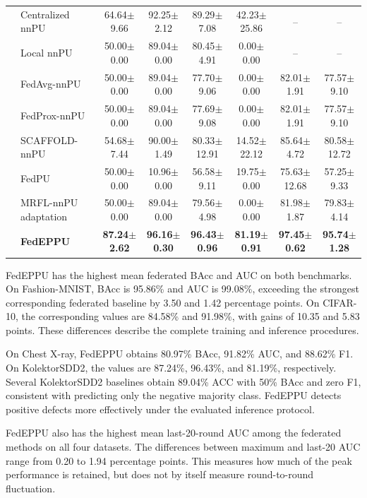 \documentclass[lettersize,journal]{IEEEtran}
\begin{document}
\begin{table}[!t]
\begin{tabular}{llcccccc}
& Centralized nnPU & 64.64$\pm$9.66 & 92.25$\pm$2.12 & 89.29$\pm$7.08 & 42.23$\pm$25.86 & -- & -- \\
& Local nnPU & 50.00$\pm$0.00 & 89.04$\pm$0.00 & 80.45$\pm$4.91 & 0.00$\pm$0.00 & -- & -- \\
& FedAvg-nnPU & 50.00$\pm$0.00 & 89.04$\pm$0.00 & 77.70$\pm$9.06 & 0.00$\pm$0.00 & 82.01$\pm$1.91 & 77.57$\pm$9.10 \\
& FedProx-nnPU & 50.00$\pm$0.00 & 89.04$\pm$0.00 & 77.69$\pm$9.08 & 0.00$\pm$0.00 & 82.01$\pm$1.91 & 77.57$\pm$9.10 \\
& SCAFFOLD-nnPU & 54.68$\pm$7.44 & 90.00$\pm$1.49 & 80.33$\pm$12.91 & 14.52$\pm$22.12 & 85.64$\pm$4.72 & 80.58$\pm$12.72 \\
& FedPU & 50.00$\pm$0.00 & 10.96$\pm$0.00 & 56.58$\pm$9.11 & 19.75$\pm$0.00 & 75.63$\pm$12.68 & 57.25$\pm$9.33 \\
& MRFL-nnPU adaptation & 50.00$\pm$0.00 & 89.04$\pm$0.00 & 79.56$\pm$4.98 & 0.00$\pm$0.00 & 81.98$\pm$1.87 & 79.83$\pm$4.14 \\
& \textbf{FedEPPU} & \textbf{87.24$\pm$2.62} & \textbf{96.16$\pm$0.30} & \textbf{96.43$\pm$0.96} & \textbf{81.19$\pm$0.91} & \textbf{97.45$\pm$0.62} & \textbf{95.74$\pm$1.28} \\
\bottomrule
\end{tabular}
\end{table}

FedEPPU has the highest mean federated BAcc and AUC on both benchmarks. On Fashion-MNIST, BAcc is 95.86\% and AUC is 99.08\%, exceeding the strongest corresponding federated baseline by 3.50 and 1.42 percentage points. On CIFAR-10, the corresponding values are 84.58\% and 91.98\%, with gains of 10.35 and 5.83 points. These differences describe the complete training and inference procedures.

On Chest X-ray, FedEPPU obtains 80.97\% BAcc, 91.82\% AUC, and 88.62\% F1. On KolektorSDD2, the values are 87.24\%, 96.43\%, and 81.19\%, respectively. Several KolektorSDD2 baselines obtain 89.04\% ACC with 50\% BAcc and zero F1, consistent with predicting only the negative majority class. FedEPPU detects positive defects more effectively under the evaluated inference protocol.

FedEPPU also has the highest mean last-20-round AUC among the federated methods on all four datasets. The differences between maximum and last-20 AUC range from 0.20 to 1.94 percentage points. This measures how much of the peak performance is retained, but does not by itself measure round-to-round fluctuation.
\end{document}
